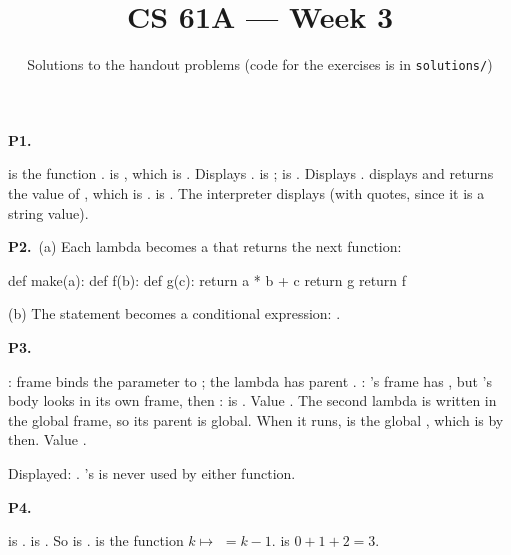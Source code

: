 \documentclass[10pt]{scrartcl}
\title{CS 61A --- Week 3}
\subtitle{Solutions to the handout problems (code for the exercises is in \texttt{solutions/})}
\author{}\date{}\ihead{}
\begin{document}
\maketitle

\begin{prob}\textbf{P1.}
\begin{steps}
  \ii {} is the function .  is , which is . Displays .
  \ii {} is ;  is . Displays .
  \ii {} displays  and returns the value of , which is .  is . The interpreter displays  (with quotes, since it is a string value).
\end{steps}
\end{prob}

\begin{prob}\textbf{P2.}\ (a) Each lambda becomes a  that returns the next function:
\begin{py}
def make(a):
    def f(b):
        def g(c):
            return a * b + c
        return g
    return f
\end{py}
(b) The  statement becomes a conditional expression: .
\end{prob}

\begin{prob}\textbf{P3.}
\begin{steps}
  \ii {}: frame  binds the parameter  to ; the lambda has parent .
  \ii {}: 's frame has , but 's body looks in its own frame, then :  is . Value .
  \ii The second lambda is written in the global frame, so its parent is global. When it runs,  is the global , which is  by then. Value .
\end{steps}
Displayed: . 's  is never used by either function.
\end{prob}

\begin{prob}\textbf{P4.}
\begin{steps}
  \ii {} is .
  \ii {} is . So  is .
  \ii {} is the function $k\mapsto$  $=k-1$.  is $0+1+2=3$.
\end{steps}
\end{prob}
\end{document}
